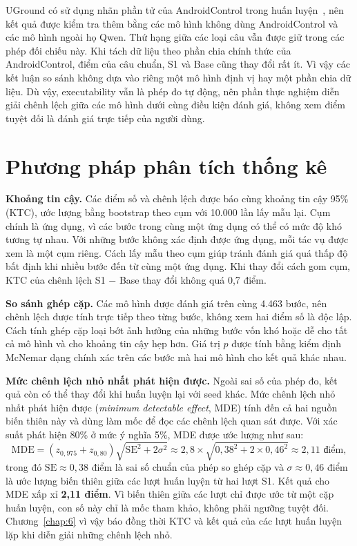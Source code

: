 UGround có sử dụng nhãn phần tử của AndroidControl trong huấn luyện~\cite{uground}, nên kết quả được kiểm tra thêm bằng các mô hình không dùng AndroidControl và các mô hình ngoài họ Qwen. Thứ hạng giữa các loại câu vẫn được giữ trong các phép đối chiếu này. Khi tách dữ liệu theo phần chia chính thức của AndroidControl, điểm của câu chuẩn, S1 và Base cũng thay đổi rất ít. Vì vậy các kết luận so sánh không dựa vào riêng một mô hình định vị hay một phần chia dữ liệu. Dù vậy, executability vẫn là phép đo tự động, nên phần thực nghiệm diễn giải chênh lệch giữa các mô hình dưới cùng điều kiện đánh giá, không xem điểm tuyệt đối là đánh giá trực tiếp của người dùng.

\section{Phương pháp phân tích thống kê}\label{sec:5.13}

\textbf{Khoảng tin cậy.} Các điểm số và chênh lệch được báo cùng khoảng tin cậy 95\% (KTC), ước lượng bằng bootstrap theo cụm với 10.000 lần lấy mẫu lại. Cụm chính là ứng dụng, vì các bước trong cùng một ứng dụng có thể có mức độ khó tương tự nhau. Với những bước không xác định được ứng dụng, mỗi tác vụ được xem là một cụm riêng. Cách lấy mẫu theo cụm giúp tránh đánh giá quá thấp độ bất định khi nhiều bước đến từ cùng một ứng dụng. Khi thay đổi cách gom cụm, KTC của chênh lệch S1 $-$ Base thay đổi không quá 0,7 điểm.

\textbf{So sánh ghép cặp.} Các mô hình được đánh giá trên cùng 4.463 bước, nên chênh lệch được tính trực tiếp theo từng bước, không xem hai điểm số là độc lập. Cách tính ghép cặp loại bớt ảnh hưởng của những bước vốn khó hoặc dễ cho tất cả mô hình và cho khoảng tin cậy hẹp hơn. Giá trị $p$ được tính bằng kiểm định McNemar dạng chính xác trên các bước mà hai mô hình cho kết quả khác nhau.

\textbf{Mức chênh lệch nhỏ nhất phát hiện được.} Ngoài sai số của phép đo, kết quả còn có thể thay đổi khi huấn luyện lại với seed khác. Mức chênh lệch nhỏ nhất phát hiện được (\emph{minimum detectable effect}, MDE) tính đến cả hai nguồn biến thiên này và dùng làm mốc để đọc các chênh lệch quan sát được. Với xác suất phát hiện 80\% ở mức ý nghĩa 5\%, MDE được ước lượng như sau:
\begin{equation}
\mathrm{MDE} = (z_{0{,}975} + z_{0{,}80})\sqrt{\mathrm{SE}^2 + 2\sigma^2} \approx 2{,}8 \times \sqrt{0{,}38^2 + 2 \times 0{,}46^2} \approx 2{,}11 \text{ điểm},
\label{eq:5.mde}
\end{equation}
\noindent trong đó $\mathrm{SE} \approx 0{,}38$ điểm là sai số chuẩn của phép so ghép cặp và $\sigma \approx 0{,}46$ điểm là ước lượng biến thiên giữa các lượt huấn luyện từ hai lượt S1. Kết quả cho MDE xấp xỉ \textbf{2,11 điểm}. Vì biến thiên giữa các lượt chỉ được ước từ một cặp huấn luyện, con số này chỉ là mốc tham khảo, không phải ngưỡng tuyệt đối. Chương~\ref{chap:6} vì vậy báo đồng thời KTC và kết quả của các lượt huấn luyện lặp khi diễn giải những chênh lệch nhỏ.

